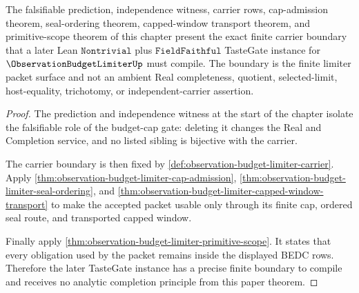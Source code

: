 \begin{theorem}
\label{thm:observation-budget-limiter-tastegate-boundary}
The falsifiable prediction, independence witness, carrier rows, cap-admission theorem, seal-ordering theorem, capped-window transport theorem, and primitive-scope theorem of this chapter present the exact finite carrier boundary that a later Lean $\texttt{Nontrivial}$ plus $\texttt{FieldFaithful}$ TasteGate instance for $\ObservationBudgetLimiterUp$ must compile. The boundary is the finite limiter packet surface and not an ambient Real completeness, quotient, selected-limit, host-equality, trichotomy, or independent-carrier assertion.
\end{theorem}
\begin{proof}
The prediction and independence witness at the start of the chapter isolate the falsifiable role of the budget-cap gate: deleting it changes the Real and Completion service, and no listed sibling is bijective with the carrier.

The carrier boundary is then fixed by \autoref{def:observation-budget-limiter-carrier}. Apply \autoref{thm:observation-budget-limiter-cap-admission}, \autoref{thm:observation-budget-limiter-seal-ordering}, and \autoref{thm:observation-budget-limiter-capped-window-transport} to make the accepted packet usable only through its finite cap, ordered seal route, and transported capped window.

Finally apply \autoref{thm:observation-budget-limiter-primitive-scope}. It states that every obligation used by the packet remains inside the displayed BEDC rows. Therefore the later TasteGate instance has a precise finite boundary to compile and receives no analytic completion principle from this paper theorem.
\end{proof}

